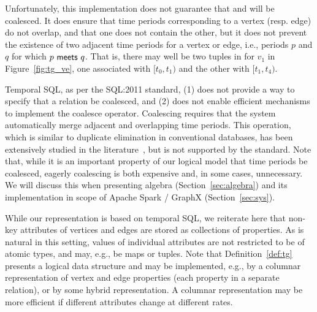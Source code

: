 Unfortunately, this implementation does not guarantee that \tv and \te
will be coalesced.  It does ensure that time periods corresponding to
a vertex (resp. edge) do not overlap, and that one does not contain
the other, but it does not prevent the existence of two adjacent time
periods for a vertex or edge, i.e., periods $p$ and $q$ for which
$p~\mathsf{meets}~q$.  That is, there may well be two tuples in \tv
for $v_1$ in Figure~\ref{fig:tg_ve}, one associated with $[t_0,t_1)$
  and the other with $[t_1,t_4)$.

Temporal SQL, as per the SQL:2011 standard, (1) does not provide a way
to specify that a relation be coalesced, and (2) does not enable
efficient mechanisms to implement the coalesce operator.  Coalescing
requires that the system automatically merge adjacent and overlapping
time periods.  This operation, which is similar to duplicate
elimination in conventional databases, has been extensively studied in
the
literature~\cite{DBLP:conf/vldb/BohlenSS96,DBLP:journals/sigmod/Zimanyi06},
but is not supported by the standard.  Note that, while it is an
important property of our logical model that time periods be
coalesced, eagerly coalescing is both expensive and, in some cases,
unnecessary.  We will discuss this when presenting \tg algebra
(Section~\ref{sec:algebra}) and its implementation in scope of Apache
Spark / GraphX (Section~\ref{sec:sys}).

While our \ve representation is based on temporal SQL, we reiterate
here that non-key attributes of vertices and edges are stored as
collections of properties.  As is natural in this setting, values of
individual attributes are not restricted to be of atomic types, and
may, e.g., be maps or tuples.  Note that Definition~\ref{def:tg}
presents a logical data structure and may be implemented, e.g., by a
columnar representation of vertex and edge properties (each property
in a separate relation), or by some hybrid representation.  A columnar
representation may be more efficient if different attributes change at
different rates.


